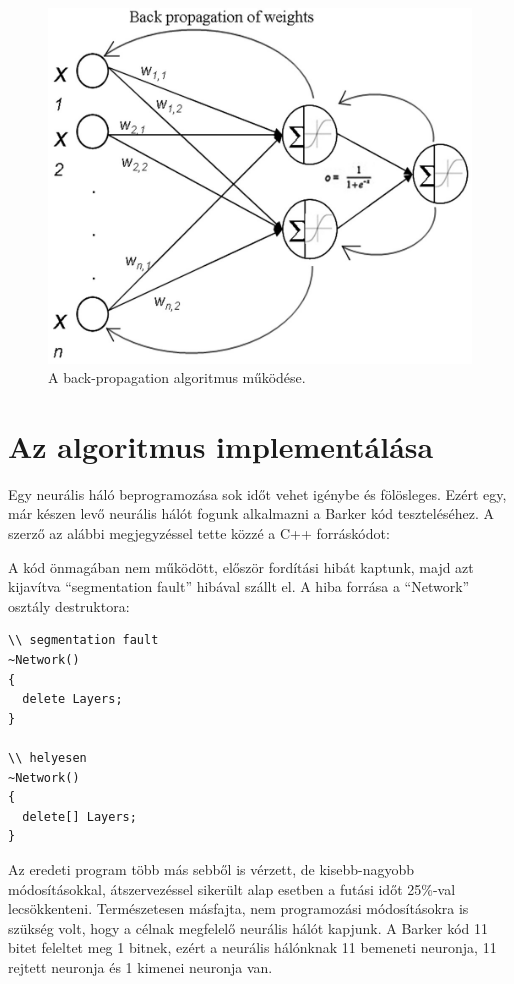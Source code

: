 \documentclass[a4paper]{article}
\begin{document}
\begin{figure}
  \centering
  \includegraphics[scale=0.8]{backpropagation}
  \caption{A back-propagation algoritmus működése.}
  \label{backpropagation}
\end{figure}

\section{Az algoritmus implementálása}
Egy neurális háló beprogramozása sok időt vehet igénybe és fölösleges. Ezért egy, már készen levő neurális hálót fogunk alkalmazni a Barker kód teszteléséhez. A szerző az alábbi megjegyzéssel tette közzé a C++ forráskódot:



A kód önmagában nem működött, először fordítási hibát kaptunk, majd azt kijavítva ``segmentation fault'' hibával szállt el. A hiba forrása a ``Network'' osztály destruktora:

\begin{lstlisting}
\\ segmentation fault
~Network()
{
  delete Layers;
}

\\ helyesen
~Network()
{
  delete[] Layers;
}
\end{lstlisting}

Az eredeti program több más sebből is vérzett, de kisebb-nagyobb módosításokkal, átszervezéssel sikerült alap esetben a futási időt 25\%-val lecsökkenteni.
Természetesen másfajta, nem programozási módosításokra is szükség volt, hogy a célnak megfelelő neurális hálót kapjunk. A Barker kód 11 bitet feleltet meg 1 bitnek, ezért a neurális hálónknak 11 bemeneti neuronja, 11 rejtett neuronja és 1 kimenei neuronja van.
\end{document}
